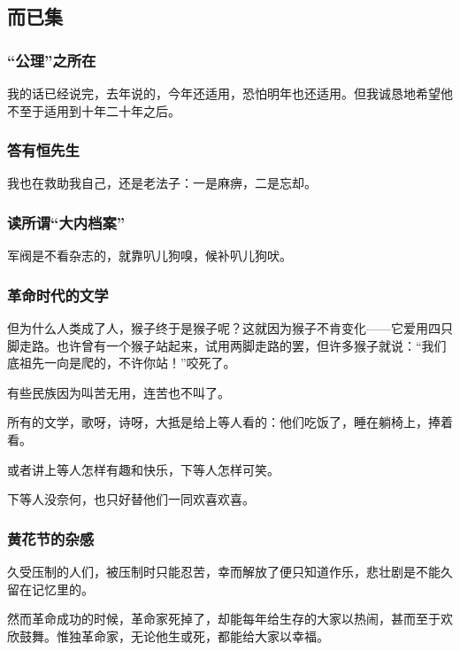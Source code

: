 \documentclass[a4paper]{article}
\begin{document}
    \begin{sloppy}
        \part{而已集}
        \section{
            “公理”之所在
        } {
            \setlength{\parindent}{2em}
            我的话已经说完，去年说的，今年还适用，恐怕明年也还适用。但我诚恳地希望他不至于适用到十年二十年之后。
        }

        \section{
            答有恒先生
        }
        我也在救助我自己，还是老法子：一是麻痹，二是忘却。

        \section{
            读所谓“大内档案”
        }

        军阀是不看杂志的，就靠叭儿狗嗅，候补叭儿狗吠。

        \section{
            革命时代的文学
        }
        但为什么人类成了人，猴子终于是猴子呢？这就因为猴子不肯变化——它爱用四只脚走路。也许曾有一个猴子站起来，试用两脚走路的罢，但许多猴子就说：“我们底祖先一向是爬的，不许你站！”咬死了。

        有些民族因为叫苦无用，连苦也不叫了。

        所有的文学，歌呀，诗呀，大抵是给上等人看的：他们吃饭了，睡在躺椅上，捧着看。

        或者讲上等人怎样有趣和快乐，下等人怎样可笑。
        
        下等人没奈何，也只好替他们一同欢喜欢喜。

        \section{
            黄花节的杂感
        }
        久受压制的人们，被压制时只能忍苦，幸而解放了便只知道作乐，悲壮剧是不能久留在记忆里的。

        然而革命成功的时候，革命家死掉了，却能每年给生存的大家以热闹，甚而至于欢欣鼓舞。惟独革命家，无论他生或死，都能给大家以幸福。


\end{sloppy}
\end{document}
